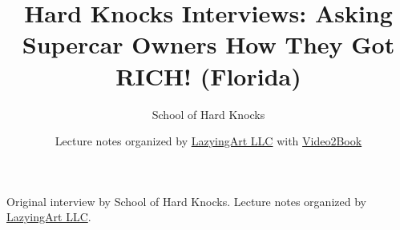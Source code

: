 \documentclass[11pt,oneside]{book}
\begin{document}
\frontmatter
\title{Hard Knocks Interviews: Asking Supercar Owners How They Got RICH! (Florida)}
\author{School of Hard Knocks}
\date{Lecture notes organized by \href{https://lazying.art}{LazyingArt LLC} with \href{https://github.com/lachlanchen/Video2Book}{Video2Book}}
\maketitle
\begin{center}
\small Original interview by School of Hard Knocks. Lecture notes organized by \href{https://lazying.art}{LazyingArt LLC}.
\end{center}
\clearpage
\mainmatter

\end{document}
